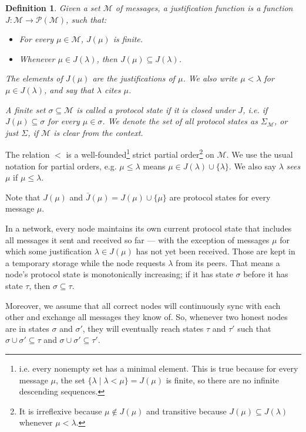 \documentclass[12pt, fleqn]{article}
\newtheorem{definition}{Definition}
\begin{document}
\begin{definition}
  Given a set $\mathcal{M}$ of \emph{messages}, a \emph{justification function} is a function $J: \mathcal{M} \rightarrow \mathcal{P}(\mathcal{M})$, such that:
  \begin{itemize}
    \item For every $\mu \in \mathcal{M}$, $J(\mu)$ is finite.
    \item Whenever $\mu \in J(\lambda)$, then $J(\mu) \subseteq J(\lambda)$.
  \end{itemize}
  The elements of $J(\mu)$ are the \emph{justifications} of $\mu$. We also write $\mu < \lambda$ for $\mu \in J(\lambda)$, and say that $\lambda$ \emph{cites} $\mu$.

  A finite set $\sigma \subseteq \mathcal{M}$ is called a \emph{protocol state} if it is closed under $J$, i.e. if $J(\mu) \subseteq \sigma$ for every $\mu \in \sigma$. We denote the set of all protocol states as $\Sigma_{\mathcal{M}}$, or just $\Sigma$, if $\mathcal{M}$ is clear from the context.
\end{definition}

The relation $<$ is a well-founded\footnote{i.e. every nonempty set has a minimal element. This is true because for every message $\mu$, the set $\{ \lambda \mid \lambda < \mu \} = J(\mu)$ is finite, so there are no infinite descending sequences.} strict partial order\footnote{It is irreflexive because $\mu \notin J(\mu)$ and transitive because $J(\mu) \subseteq J(\lambda)$ whenever $\mu < \lambda$.} on $\mathcal{M}$. We use the usual notation for partial orders, e.g. $\mu \leq \lambda$ means $\mu \in J(\lambda) \cup \{\lambda\}$. We also say $\lambda$ \emph{sees} $\mu$ if $\mu \leq \lambda$.

Note that $J(\mu)$ and $\bar{J}(\mu) = J(\mu) \cup \{\mu\}$ are protocol states for every message $\mu$.

In a network, every node maintains its own current protocol state that includes all messages it sent and received so far --- with the exception of messages $\mu$ for which some justification $\lambda \in J(\mu)$ has not yet been received. Those are kept in a temporary storage while the node requests $\lambda$ from its peers. That means a node's protocol state is monotonically increasing; if it has state $\sigma$ before it has state $\tau$, then $\sigma \subseteq \tau$.

Moreover, we assume that all correct nodes will continuously sync with each other and exchange all messages they know of. So, whenever two honest nodes are in states $\sigma$ and $\sigma'$, they will eventually reach states $\tau$ and $\tau'$ such that $\sigma \cup \sigma' \subseteq \tau$ and $\sigma \cup \sigma' \subseteq \tau'$.
\end{document}
